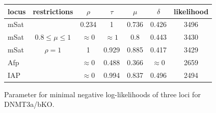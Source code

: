 \begin{figure}[h]
\begin{center}
\begin{tabularx}{\textwidth}{l|c|c|c|c|c|c}
locus&	restrictions&	$\rho$&	$\tau$&	$\mu$&	$\delta$&	likelihood\\
\hline
mSat&	&	0.234&	1&	0.736&	0.426&	3496\\
mSat&	$0.8 \leq \mu \leq 1$&	$\approx 0$&	$\approx 1$&	0.8&	0.443&	3430\\
mSat&	$\rho=1$&	1&	0.929&	0.885&	0.417&	3429\\
Afp&	&	$\approx 0$&	0.488&	0.366&	$\approx 0$&	2659\\
IAP&	&	$\approx 0$&	0.994&	0.837&	0.496&	2494\\
\end{tabularx}
\end{center}
\label{DNMT3KO}
\caption{Parameter for minimal negative log-likelihoods of three loci for DNMT3a/bKO.}
\end{figure}

